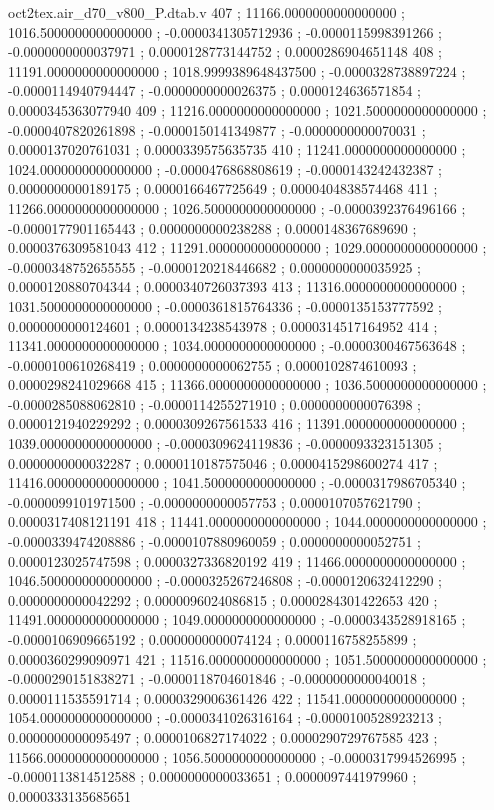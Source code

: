 \begin{filecontents}[overwrite]{oct2tex.air_d70_v800_P.dtab.v}
407 ; 11166.0000000000000000 ; 1016.5000000000000000 ; -0.0000341305712936 ; -0.0000115998391266 ; -0.0000000000037971 ; 0.0000128773144752 ; 0.0000286904651148
408 ; 11191.0000000000000000 ; 1018.9999389648437500 ; -0.0000328738897224 ; -0.0000114940794447 ; -0.0000000000026375 ; 0.0000124636571854 ; 0.0000345363077940
409 ; 11216.0000000000000000 ; 1021.5000000000000000 ; -0.0000407820261898 ; -0.0000150141349877 ; -0.0000000000070031 ; 0.0000137020761031 ; 0.0000339575635735
410 ; 11241.0000000000000000 ; 1024.0000000000000000 ; -0.0000476868808619 ; -0.0000143242432387 ; 0.0000000000189175 ; 0.0000166467725649 ; 0.0000404838574468
411 ; 11266.0000000000000000 ; 1026.5000000000000000 ; -0.0000392376496166 ; -0.0000177901165443 ; 0.0000000000238288 ; 0.0000148367689690 ; 0.0000376309581043
412 ; 11291.0000000000000000 ; 1029.0000000000000000 ; -0.0000348752655555 ; -0.0000120218446682 ; 0.0000000000035925 ; 0.0000120880704344 ; 0.0000340726037393
413 ; 11316.0000000000000000 ; 1031.5000000000000000 ; -0.0000361815764336 ; -0.0000135153777592 ; 0.0000000000124601 ; 0.0000134238543978 ; 0.0000314517164952
414 ; 11341.0000000000000000 ; 1034.0000000000000000 ; -0.0000300467563648 ; -0.0000100610268419 ; 0.0000000000062755 ; 0.0000102874610093 ; 0.0000298241029668
415 ; 11366.0000000000000000 ; 1036.5000000000000000 ; -0.0000285088062810 ; -0.0000114255271910 ; 0.0000000000076398 ; 0.0000121940229292 ; 0.0000309267561533
416 ; 11391.0000000000000000 ; 1039.0000000000000000 ; -0.0000309624119836 ; -0.0000093323151305 ; 0.0000000000032287 ; 0.0000110187575046 ; 0.0000415298600274
417 ; 11416.0000000000000000 ; 1041.5000000000000000 ; -0.0000317986705340 ; -0.0000099101971500 ; -0.0000000000057753 ; 0.0000107057621790 ; 0.0000317408121191
418 ; 11441.0000000000000000 ; 1044.0000000000000000 ; -0.0000339474208886 ; -0.0000107880960059 ; 0.0000000000052751 ; 0.0000123025747598 ; 0.0000327336820192
419 ; 11466.0000000000000000 ; 1046.5000000000000000 ; -0.0000325267246808 ; -0.0000120632412290 ; 0.0000000000042292 ; 0.0000096024086815 ; 0.0000284301422653
420 ; 11491.0000000000000000 ; 1049.0000000000000000 ; -0.0000343528918165 ; -0.0000106909665192 ; 0.0000000000074124 ; 0.0000116758255899 ; 0.0000360299090971
421 ; 11516.0000000000000000 ; 1051.5000000000000000 ; -0.0000290151838271 ; -0.0000118704601846 ; -0.0000000000040018 ; 0.0000111535591714 ; 0.0000329006361426
422 ; 11541.0000000000000000 ; 1054.0000000000000000 ; -0.0000341026316164 ; -0.0000100528923213 ; 0.0000000000095497 ; 0.0000106827174022 ; 0.0000290729767585
423 ; 11566.0000000000000000 ; 1056.5000000000000000 ; -0.0000317994526995 ; -0.0000113814512588 ; 0.0000000000033651 ; 0.0000097441979960 ; 0.0000333135685651

\end{filecontents}
